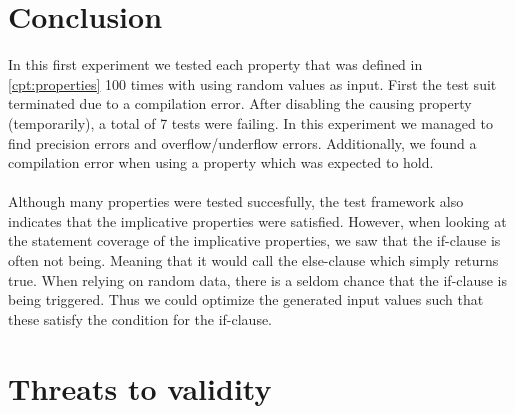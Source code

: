 \section{Conclusion}
In this first experiment we tested each property that was defined in \autoref{cpt:properties} 100 times with using random values as input. First the test suit terminated due to a compilation error. After disabling the causing property (temporarily), a total of 7 tests were failing. In this experiment we managed to find precision errors and overflow/underflow errors. Additionally, we found a compilation error when using a property which was expected to hold.\\
\\
Although many properties were tested succesfully, the test framework also indicates that the implicative properties were satisfied. However, when looking at the statement coverage of the implicative properties, we saw that the if-clause is often not being. Meaning that it would call the else-clause which simply returns true. When relying on random data, there is a seldom chance that the if-clause is being triggered. Thus we could optimize the generated input values such that these satisfy the condition for the if-clause.

\section{Threats to validity}

